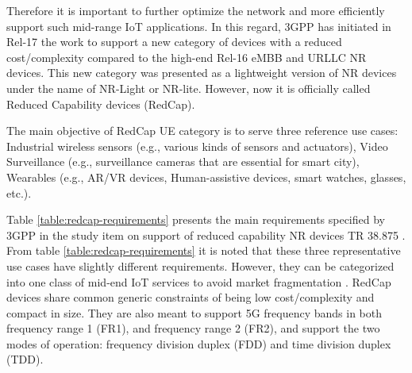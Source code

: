 \documentclass[]{IEEEtran}
\begin{document}
Therefore it is important to further optimize the network and more efficiently support such mid-range IoT applications. In this regard, 3GPP has initiated in Rel-17 the work to support a new category of devices with a reduced cost/complexity compared to the high-end Rel-16 eMBB and URLLC NR devices. This new category was presented as a lightweight version of NR devices under the name of NR-Light or NR-lite. However, now it is officially called Reduced Capability devices (RedCap).

The main objective of RedCap UE category is to serve three reference use cases: Industrial wireless sensors (e.g., various kinds of sensors and actuators), Video Surveillance (e.g., surveillance cameras that are essential for smart city), Wearables (e.g., AR/VR devices, Human-assistive devices, smart watches, glasses,  etc.).

Table \ref{table:redcap-requirements} presents the main requirements specified by 3GPP in the study item on support of reduced capability NR devices TR 38.875 \cite{3gpp_study_2021_38.875}. From table \ref{table:redcap-requirements} it is noted that these three representative use cases have slightly different requirements. However, they can be categorized into one class of mid-end IoT services to avoid market fragmentation \cite{3gpp_framework_2020_R2-2009618}. RedCap devices share common generic constraints of being low cost/complexity and compact in size. They are also meant to support 5G frequency bands in both frequency range 1 (FR1), and frequency range 2 (FR2), and support the two modes of operation: frequency division duplex (FDD) and time division duplex (TDD).
\end{document}
